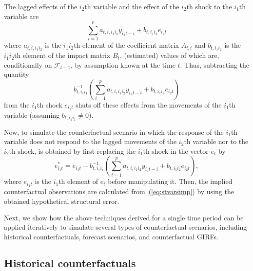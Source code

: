 \documentclass[nojss]{jss}
\begin{document}
The lagged effects of the $i_2$th variable and the effect of the $i_2$th shock to the $i_1$th variable are
\begin{equation}\label{eq:i2effects}
\sum_{i=1}^p a_{t,i,i_1i_2}y_{i_2t-i} + b_{t,i_1i_2}e_{i_2t}
\end{equation}
where $a_{t,i,i_1i_2}$ is the $i_1i_2$th element of the coefficient matrix $A_{t,i}$ and $b_{t,i_1i_2}$ is the $i_1i_2$th element of the impact matrix $B_t$, (estimated) values of which are, conditionally on $\mathcal{F}_{t-1}$, by assumption known at the time $t$. Thus, subtracting the quantity
\begin{equation}\label{eq:shut_e_t}
b_{t,i_1i_1}^{-1}\left(\sum_{i=1}^p a_{t,i,i_1i_2}y_{i_2t-i} + b_{t,i_1i_2}e_{i_2t}\right)
\end{equation}
from the $i_1$th shock $e_{i_1t}$ shuts off these effects from the movements of the $i_1$th variable (assuming $b_{t,i_1i_1}\neq 0$).

Now, to simulate the counterfactual scenario in which the response of the $i_1$th variable does not respond to the lagged movements of the $i_2$th variable nor to the $i_2$th shock, is obtained by first replacing the $i_1$th shock in the vector $e_t$ by
\begin{equation}\label{eq:val_e_t2}
e_{i_1t}^* = e_{i_1t} - b_{t,i_1i_1}^{-1}\left(\sum_{i=1}^p a_{t,i,i_1i_2}y_{i_2t-i} + b_{t,i_1i_2}e_{i_2t}\right),
\end{equation}
where $e_{i_1t}$ is the $i_1$th element of $e_t$ before manipulating it. Then, the implied counterfactual observations are calculated from~(\ref{eq:stvarsimp}) by using the obtained hypothetical structural error.

Next, we show how the above techniques derived for a single time period can be applied iteratively to simulate several types of counterfactual scenarios, including historical counterfactuals, forecast scenarios, and counterfactual GIRFs.


\subsection{Historical counterfactuals}
\end{document}
